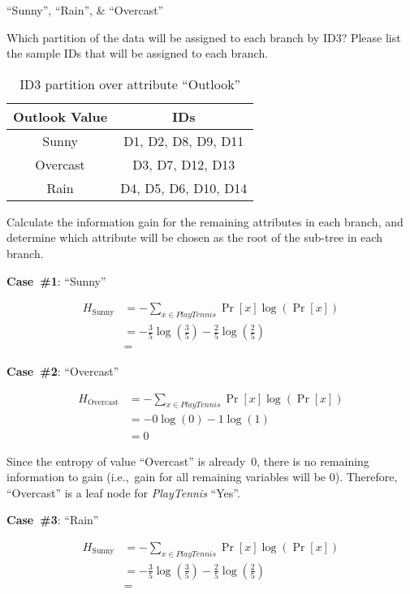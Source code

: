 ``Sunny'', ``Rain'', \& ``Overcast''

\begin{subproblem}
  Which partition of the data will be assigned to each branch by ID3? Please list the sample IDs that will be assigned to each branch.
\end{subproblem}

\begin{table}[h]
  \centering
  \caption{ID3 partition over attribute ``Outlook''}\label{tab:P02:Partition}
  \begin{tabular}{|c|c|}
    \hline
    \textbf{Outlook Value} & \textbf{IDs} \\\hline
    Sunny    & D1, D2, D8, D9, D11 \\\hline
    Overcast & D3, D7, D12, D13 \\\hline
    Rain     & D4, D5, D6, D10, D14 \\\hline
  \end{tabular}
\end{table}

\begin{subproblem}
  Calculate the information gain for the remaining attributes in each branch, and determine which attribute will be chosen as the root of the sub-tree in each branch.
\end{subproblem}

\noindent
\textbf{Case~\#1}: ``Sunny''

\begin{align*}
  H_{\text{Sunny}} &= -\sum_{x\in PlayTennis} \Pr[x] \log \left(\Pr[x]\right) \\
                   &= - \frac{3}{5} \log\left(\frac{3}{5}\right) - \frac{2}{5} \log\left(\frac{2}{5}\right) \\
                   &=
\end{align*}

\noindent
\textbf{Case~\#2}: ``Overcast''

\begin{align*}
  H_{\text{Overcast}} &= -\sum_{x\in PlayTennis} \Pr[x] \log \left(\Pr[x] \right)\\
                      &= - 0 \log(0) - 1 \log(1) \\
                      &= 0
\end{align*}

Since the entropy of value ``Overcast'' is already~0, there is no remaining information to gain (i.e.,~gain for all remaining variables will be 0).  Therefore, ``Overcast'' is a leaf node for \textit{PlayTennis} ``Yes''.

\noindent
\textbf{Case~\#3}: ``Rain''

\begin{align*}
  H_{\text{Sunny}} &= -\sum_{x\in PlayTennis} \Pr[x] \log \left(\Pr[x]\right) \\
                   &= - \frac{3}{5} \log\left(\frac{3}{5}\right) - \frac{2}{5} \log\left(\frac{2}{5}\right) \\
                   &=
\end{align*}
